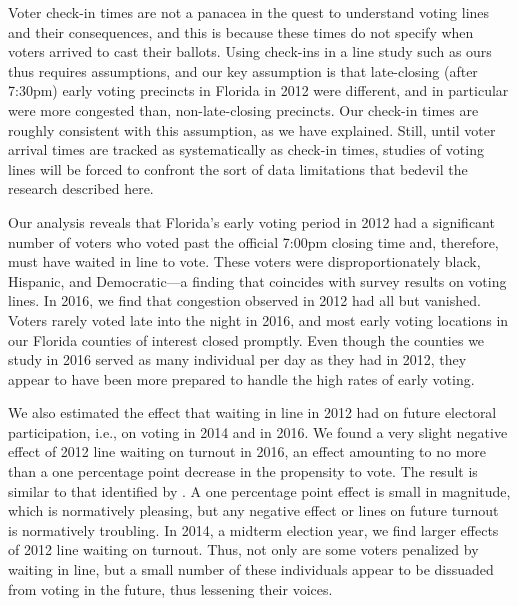 \documentclass[12pt,titlepage]{article}
\begin{document}
Voter check-in times are not a panacea in the quest to understand
voting lines and their consequences, and this is because these times
do not specify when voters arrived to cast their ballots. Using
check-ins in a line study such as ours thus requires assumptions, and
our key assumption is that late-closing (after 7:30pm) early voting
precincts in Florida in 2012 were different, and in particular were
more congested than, non-late-closing precincts.  Our check-in times
are roughly consistent with this assumption, as we have explained.
Still, until voter arrival times are tracked as systematically as
check-in times, studies of voting lines will be forced to confront the
sort of data limitations that bedevil the research described here.

Our analysis reveals that Florida's early voting period in 2012 had a
significant number of voters who voted past the official 7:00pm
closing time and, therefore, must have waited in line to vote.  These
voters were disproportionately black, Hispanic, and Democratic---a
finding that coincides with survey results on voting lines.  In 2016,
we find that congestion observed in 2012 had all but vanished.  Voters
rarely voted late into the night in 2016, and most early voting
locations in our Florida counties of interest closed promptly.  Even
though the counties we study in 2016 served as many individual per day
as they had in 2012, they appear to have been more prepared to handle
the high rates of early voting.
  
We also estimated the effect that waiting in line in 2012 had on future
electoral participation, i.e., on voting in 2014 and in 2016.  We
found a very slight negative effect of 2012 line waiting on turnout in
2016, an effect amounting to no more than a one percentage point
decrease in the propensity to vote. The result is similar to that
identified by \citet{pettigrew:racegapwaittimes}.  A one percentage
point effect is small in magnitude, which is normatively pleasing, but
any negative effect or lines on future turnout is normatively
troubling.  In 2014, a midterm election year, we find larger effects
of 2012 line waiting on turnout.  Thus, not only are some voters
penalized by waiting in line, but a small number of these individuals
appear to be dissuaded from voting in the future, thus lessening their
voices.

\end{document}
